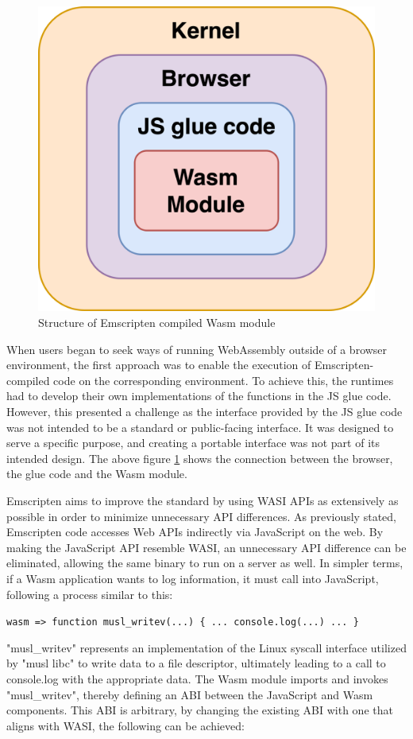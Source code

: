 \begin{figure}[H]
    \centering
        \includegraphics[width=0.6\linewidth]{images/wasm/Emscripten.png}
    \caption{Structure of Emscripten compiled Wasm module}
    \label{fig:emscripten}
\end{figure}

When users began to seek ways of running WebAssembly outside of a browser environment, the first approach was to enable the execution of Emscripten-compiled code on the corresponding environment.
To achieve this, the runtimes had to develop their own implementations of the functions in the JS glue code. However, this presented a challenge as the interface provided by the JS glue code was not intended to be a standard or public-facing interface. It was designed to serve a specific purpose, and creating a portable interface was not part of its intended design. The above figure \ref{fig:emscripten} shows the connection between the browser, the glue code and the Wasm module. 

Emscripten aims to improve the standard by using WASI APIs as extensively as possible in order to minimize unnecessary API differences. As previously stated, Emscripten code accesses Web APIs indirectly via JavaScript on the web. By making the JavaScript API resemble WASI, an unnecessary API difference can be eliminated, allowing the same binary to run on a server as well. In simpler terms, if a Wasm application wants to log information, it must call into JavaScript, following a process similar to this:

\verb|wasm => function musl_writev(...) { ... console.log(...) ... }|

"musl\_writev" represents an implementation of the Linux syscall interface utilized by "musl libc" to write data to a file descriptor, ultimately leading to a call to console.log with the appropriate data. The Wasm module imports and invokes "musl\_writev", thereby defining an ABI between the JavaScript and Wasm components. This ABI is arbitrary, by changing the existing ABI with one that aligns with WASI, the following can be achieved:

